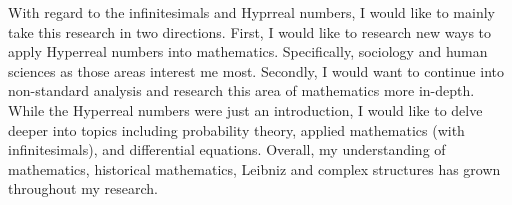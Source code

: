 \documentclass[12pt]{report}
\begin{document}
With regard to the infinitesimals and Hyprreal numbers, I would like to mainly take this research in two directions.
First, I would like to research new ways to apply Hyperreal numbers into mathematics.
Specifically, sociology and human sciences as those areas interest me most.
Secondly, I would want to continue into non-standard analysis and research this area of mathematics more in-depth.
While the Hyperreal numbers were just an introduction, I would like to delve deeper into topics including probability theory, applied mathematics (with infinitesimals), and differential equations.
Overall, my understanding of mathematics, historical mathematics, Leibniz and complex structures has grown throughout my research.
\newpage
{}
    
\end{document}
